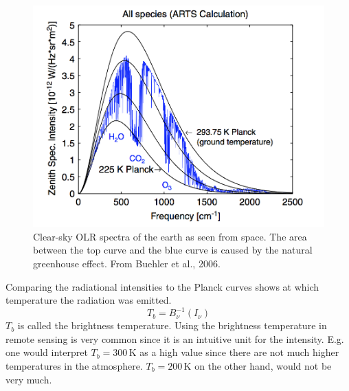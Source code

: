 \documentclass[a4paper,fleqn]{article}
\begin{document}
 \begin{figure}[h!]
\begin{center}
\includegraphics[width=1\textwidth]{figures/Buehler_et_al_OLR_spectra}
\caption{Clear-sky OLR spectra of the earth as seen from space. The area between the top curve and the blue curve is caused by the natural greenhouse effect. From Buehler et al., 2006.}
\label{Buehler_et_al_OLR_spectra}
\end{center}
\end{figure}

Comparing the radiational intensities to the Planck curves shows at which temperature the radiation was emitted. 
\begin{equation}
T_b = B^{-1}_{\nu}(I_{\nu})
\end{equation}
$T_b$ is called the brightness temperature. Using the brightness temperature in remote sensing is very common since it is an intuitive unit for the intensity. E.g. one would interpret $T_b = 300$\,K as a high value since there are not much higher temperatures in the atmosphere. $T_b = 200$\,K on the other hand, would not be very much.
 


\end{document}
